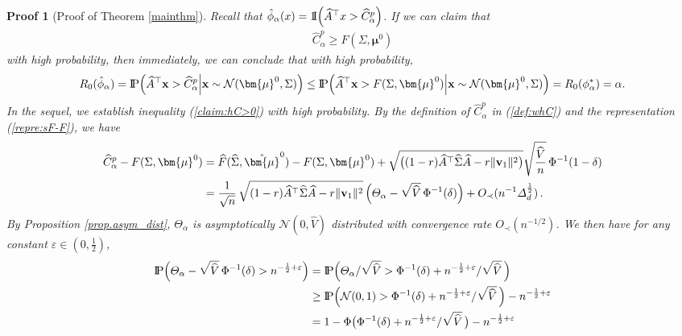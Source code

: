 \documentclass[12pt]{article}
\numberwithin{equation}{section}
\newtheorem{myPro}{Proof}
\theoremstyle{remark}
\newcommand{\p}{{\rm I}\kern-0.18em{\rm P}}
\newcommand{\1}{{\rm 1}\kern-0.24em{\rm I}}
\begin{document}
\begin{myPro} [Proof of  Theorem \ref{mainthm}]
Recall that $\hat \phi_\alpha(x)= \1 \Big( \widehat{A} ^{\top} x > \widehat C_\alpha^p\Big) $. If we can  claim  that 
\begin{align}\label{claim:hC>0}
\widehat C_\alpha^p\geq F(\Sigma, {\bm{\mu}}^0)
\end{align}
 with high probability,  then immediately, we can conclude that with high probability,
\begin{align*}
R_0(\hat \phi_\alpha) = \p \Big( \widehat{A} ^{\top} {\bf x} > \widehat C_\alpha^p\Big| {\bf x}\sim \mathcal{N}({\bm{\mu}}^0, \Sigma)\Big)\leq   \p \Big( \widehat{A} ^{\top} {\bf x} >F(\Sigma, {\bm{\mu}}^0) \Big| {\bf x}\sim \mathcal{N}({\bm{\mu}}^0, \Sigma)\Big)= R_0(\phi^*_\alpha)= \alpha.
\end{align*}
In the sequel, we establish inequality (\ref{claim:hC>0}) with high probability.
 By the definition of $\widehat C_\alpha^p$ in (\ref{def:whC}) and the representation (\ref{repre:sF-F}), we have  
 \begin{align*}
 \widehat C_\alpha^p- F(\Sigma, {\bm{\mu}}^0)
&= \widehat{F}(\widehat\Sigma, \hat{\bm{\mu}}^0)- F(\Sigma, {\bm{\mu}}^0) +\sqrt{\big((1-r) \widehat A^{\top} \widehat \Sigma\widehat A - r\Vert {\bf v}_1\Vert^2\big) }\sqrt{\frac{\widehat{V}}{n}} \, \Phi^{-1}(1-\delta)\notag\\
&=\frac {1}{\sqrt n}\,\sqrt{ (1-r)  \widehat{A} ^{\top}\widehat\Sigma \widehat{A} - r\Vert {\bf v}_1\Vert^2} \, \Big( {\varTheta_{\alpha}}- \sqrt{\widehat {V}} \, \Phi^{-1}(\delta) \Big)+ O_\prec(n^{-1} \varDelta_d^{\frac 12})\,.
\end{align*}
By Proposition \ref{prop.asym_dist}, ${\varTheta_{\alpha}}$ is asymptotically $\mathcal{N}(0, \widehat{V})$ distributed with convergence rate $O_\prec(n^{-1/2})$.
We then have  for any  constant $\varepsilon\in (0,\frac 12)$,
\begin{align*}
    \p \Big({\varTheta_{\alpha}} - \sqrt{\widehat {V}} \, \Phi^{-1}(\delta)>  n^{-\frac 12+ \varepsilon} \Big)&= \p \Big({\varTheta_{\alpha}} /\sqrt{\widehat {V}}>  \Phi^{-1}(\delta)+  n^{-\frac 12+ \varepsilon}/\sqrt{\widehat{V}} \, \Big) \notag\\
    &\geq  \p\Big(\mathcal{N}(0,1)>  \Phi^{-1}(\delta)+  n^{-\frac 12+ \varepsilon} /\sqrt{\widehat{V}} \, \Big) - n^{-\frac 12 + \varepsilon}\notag\\
    &= 1-
    \Phi\big(\Phi^{-1}(\delta)+  n^{-\frac 12+ \varepsilon}/\sqrt{\widehat{V}} \,\big) - n^{-\frac 12 + \varepsilon}\notag\\

\end{align*}
\end{myPro}
\end{document}
